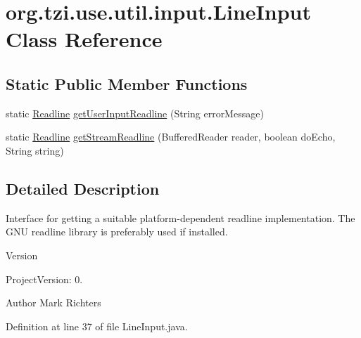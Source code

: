 \hypertarget{classorg_1_1tzi_1_1use_1_1util_1_1input_1_1_line_input}{\section{org.\-tzi.\-use.\-util.\-input.\-Line\-Input Class Reference}
\label{classorg_1_1tzi_1_1use_1_1util_1_1input_1_1_line_input}
}
\subsection*{Static Public Member Functions}
\begin{DoxyCompactItemize}
\item 
static \hyperlink{interfaceorg_1_1tzi_1_1use_1_1util_1_1input_1_1_readline}{Readline} \hyperlink{classorg_1_1tzi_1_1use_1_1util_1_1input_1_1_line_input_a79db08e1247cac1d9c6a4b72e5a9515a}{get\-User\-Input\-Readline} (String error\-Message)
\item 
static \hyperlink{interfaceorg_1_1tzi_1_1use_1_1util_1_1input_1_1_readline}{Readline} \hyperlink{classorg_1_1tzi_1_1use_1_1util_1_1input_1_1_line_input_a825d32bd8884ebd4b254c03dfc769a67}{get\-Stream\-Readline} (Buffered\-Reader reader, boolean do\-Echo, String string)
\end{DoxyCompactItemize}


\subsection{Detailed Description}
Interface for getting a suitable platform-\/dependent readline implementation. The G\-N\-U readline library is preferably used if installed.

\begin{DoxyVersion}{Version}

\end{DoxyVersion}
\begin{DoxyParagraph}{Project\-Version\-:}
0. 
\end{DoxyParagraph}
\begin{DoxyAuthor}{Author}
Mark Richters 
\end{DoxyAuthor}


Definition at line 37 of file Line\-Input.\-java.



